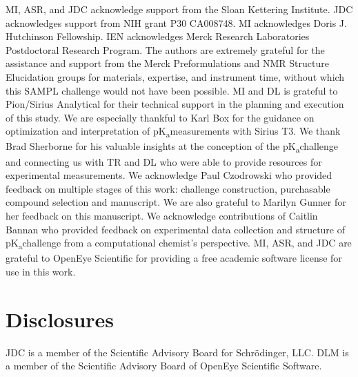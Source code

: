 \documentclass[9pt,lineno]{elife}
\newcommand{\pKa}{pK\textsubscript{a}}
\begin{document}
MI, ASR, and JDC acknowledge support from the Sloan Kettering Institute.
JDC acknowledges support from NIH grant P30 CA008748. 
MI acknowledges Doris J. Hutchinson Fellowship. IEN acknowledges Merck Research Laboratories Postdoctoral Research Program.
The authors are extremely grateful for the assistance and support from the Merck Preformulations and NMR Structure Elucidation groups for materials, expertise, and instrument time, without which this SAMPL challenge would not have been possible.
MI and DL is grateful to Pion/Sirius Analytical for their technical support in the planning and execution of this study. We are especially thankful to Karl Box for the guidance on optimization and interpretation of \pKa measurements with Sirius T3. 
We thank Brad Sherborne for his valuable insights at the conception of the \pKa challenge and connecting us with TR and DL who were able to provide resources for experimental measurements. We acknowledge Paul Czodrowski who provided feedback on multiple stages of this work: challenge construction, purchasable compound selection and manuscript. We are also grateful to Marilyn Gunner for her feedback on this manuscript.
We acknowledge contributions of Caitlin Bannan who provided feedback on experimental data collection and structure of \pKa challenge from a computational chemist's perspective. 
MI, ASR, and JDC are grateful to OpenEye Scientific for providing a free academic software license for use in this work.

\section{Disclosures}

JDC is a member of the Scientific Advisory Board for Schr\"{o}dinger, LLC.
DLM is a member of the Scientific Advisory Board of OpenEye Scientific Software.



\end{document}
